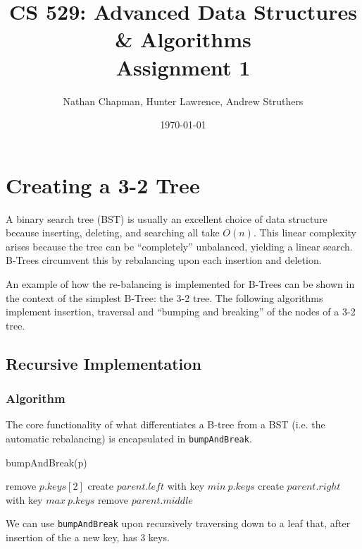 \documentclass{article}
\title{\vspace{-0.625in}CS 529: Advanced Data Structures \& Algorithms \\ Assignment 1}
\author{Nathan Chapman, Hunter Lawrence, Andrew Struthers}
\date{\today}
\begin{document}
\maketitle

\section*{Creating a 3-2 Tree}

    A binary search tree (BST) is usually an excellent choice of data structure because inserting, deleting, and searching all take $O(n)$.  This linear complexity arises because the tree can be ``completely'' unbalanced, yielding a linear search.  B-Trees circumvent this by rebalancing upon each insertion and deletion.

    An example of how the re-balancing is implemented for B-Trees can be shown in the context of the simplest B-Tree: the 3-2 tree.  The following algorithms implement insertion, traversal and ``bumping and breaking'' of the nodes of a 3-2 tree.

    \subsection*{Recursive Implementation}

        \subsubsection*{Algorithm}

            The core functionality of what differentiates a B-tree from a BST (i.e. the automatic rebalancing) is encapsulated in \texttt{bumpAndBreak}.

            \begin{function}
                \caption{bumpAndBreak(p)}
                \DontPrintSemicolon


                remove $p.keys[2]$\;
                create $parent.left$ with key $min \ p.keys$\;
                create $parent.right$ with key $max \ p.keys$\;
                remove $parent.middle$\;
            \end{function}

            We can use \texttt{bumpAndBreak} upon recursively traversing down to a leaf that, after insertion of the a new key, has 3 keys.
\end{document}
